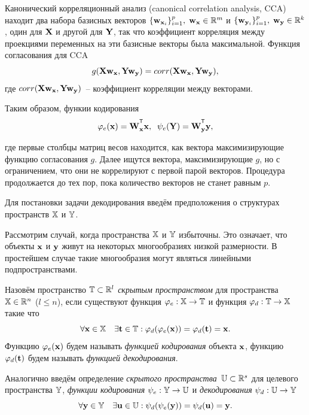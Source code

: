 \hrulefill

Канонический корреляционный анализ (canonical correlation analysis, CCA) находит два набора базисных векторов $\{\mathbf{w}_{\mathbf{x}_i}\}_{i=1}^{p}, \; \mathbf{w}_{\mathbf{x}} \in \mathbb{R}^{m}$ и $\{\mathbf{w}_{\mathbf{y}_i}\}_{i=1}^{p}, \; \mathbf{w}_{\mathbf{y}} \in \mathbb{R}^{k}$, один для $\mathbf{X}$ и другой для $\mathbf{Y}$, так что коэффициент корреляция между проекциями переменных на эти базисные векторы была максимальной. Функция согласования для CCA
\begin{equation}
	g(\mathbf{X} \mathbf{w}_{\mathbf{x}}, \mathbf{Y} \mathbf{w}_{\mathbf{y}}) = corr(\mathbf{X} \mathbf{w}_{\mathbf{x}}, \mathbf{Y} \mathbf{w}_{\mathbf{y}}),
\end{equation} 
где $corr(\mathbf{X} \mathbf{w}_{\mathbf{x}}, \mathbf{Y} \mathbf{w}_{\mathbf{y}})$~-- коэффициент корреляции между векторами.

Таким образом, функии кодирования
\begin{equation}
	\varphi_e(\bx) = \bW_{\bx}^{\T}\bx , \;\;
	\psi_e(\bY) = \bW_{\by}^{\T}\by ,
\end{equation}

где первые столбцы матриц весов находится, как вектора максимизирующие функцию согласования $g$. Далее ищутся вектора, максимизирующие $g$, но с ограничением, что они не коррелируют с первой парой векторов. Процедура продолжается до тех пор, пока количество векторов не станет равным $p$. 
 
\hrulefill
 
Для постановки задачи декодирования введём предположения о структурах пространств $\mathbb{X}$ и $\mathbb{Y}$.
\begin{assumption}
	Рассмотрим случай, когда пространства $\mathbb{X}$ и $\mathbb{Y}$ избыточны. Это означает, что объекты $\mathbf{x}$ и $\mathbf{y}$ живут на некоторых многообразиях низкой размерности. В простейшем случае такие многообразия могут являться линейными подпространствами.
\end{assumption}

\begin{definition}
	Назовём пространство $\mathbb{T} \subset \mathbb{R}^l$ \textit{скрытым пространством} для пространства $\mathbb{X} \in \mathbb{R}^n$ ($l \leq n$), если существуют функция $\varphi_e: \mathbb{X} \to \mathbb{T}$ и функция $\varphi_d: \mathbb{T}  \to \mathbb{X}$ такие что
	\[
		\forall \mathbf{x} \in \mathbb{X} \quad \exists \mathbf{t} \in \mathbb{T}: \varphi_d (\varphi_e(\mathbf{x})) = \varphi_d(\mathbf{t}) = \mathbf{x}.
	\]
	Функцию $\varphi_e(\mathbf{x})$ будем называть \textit{функцией кодирования} объекта $\mathbf{x}$, функцию $\varphi_d(\mathbf{t})$ будем называть \textit{функцией декодирования}. 
	
	
	Аналогично введём определение \textit{скрытого пространства}~$\mathbb{U} \subset \mathbb{R}^s$ для целевого пространства $\mathbb{Y}$, \textit{функции кодирования} $\psi_e: \mathbb{Y} \to \mathbb{U}$ и \textit{декодирования} $\psi_d: \mathbb{U}  \to \mathbb{Y}$
	\[
	\forall \mathbf{y} \in \mathbb{Y} \quad  \exists \mathbf{u} \in \mathbb{U}: \psi_d (\psi_e(\mathbf{y})) = \psi_d(\mathbf{u}) = \mathbf{y}.
	\]
\end{definition}

